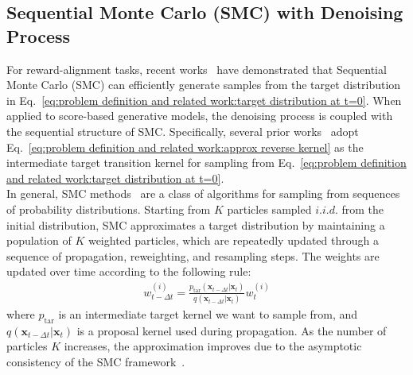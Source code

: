 \subsection{Sequential Monte Carlo (SMC) with Denoising Process}
\label{sec:problem definition and related work:smc}
For reward-alignment tasks, recent works~\cite{kim2025DAS, dou2024fps, wu2023tds, trippe2023smcdiff, cardoso2024mcgdiff} have demonstrated that Sequential Monte Carlo (SMC) can efficiently generate samples from the target distribution in Eq.~\ref{eq:problem definition and related work:target distribution at t=0}. When applied to score-based generative models, the denoising process is coupled with the sequential structure of SMC. Specifically, several prior works~\cite{uehara2025inference, kim2025DAS, wu2023tds} adopt Eq.~\ref{eq:problem definition and related work:approx reverse kernel} as the intermediate target transition kernel for sampling from Eq.~\ref{eq:problem definition and related work:target distribution at t=0}.\\
In general, SMC methods~\cite{doucet2001sequential, del2006sequential, chopin2020introduction} are a class of algorithms for sampling from sequences of probability distributions. 
Starting from $K$ particles sampled $i.i.d.$ from the initial distribution, SMC approximates a target distribution by maintaining a population of $K$ weighted particles, which are repeatedly updated through a sequence of propagation, reweighting, and resampling steps. 
The weights are updated over time according to the following rule:
\begin{align}
    \label{eq:problem definition and related work:weight for SMC}
    w_{t-\Delta t}^{(i)}=\frac{p_{\text{tar}}(\mathbf{x}_{t-\Delta t}|\mathbf{x}_{t})}{q(\mathbf{x}_{t-\Delta t}|\mathbf{x}_{t})}w_t^{(i)}
\end{align}
where $p_{\text{tar}}$ is an intermediate target kernel we want to sample from, and $q(\mathbf{x}_{t-\Delta t}|\mathbf{x}_{t})$ is a proposal kernel used during propagation.  
As the number of particles $K$ increases, the approximation improves due to the asymptotic consistency of the SMC framework~\cite{Chopin_2004, moral2004feynman}. 

